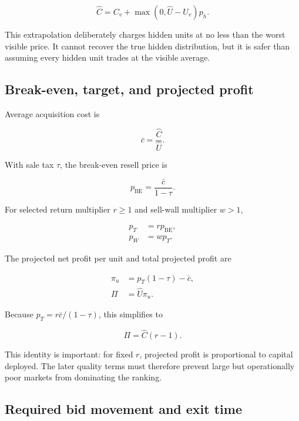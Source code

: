 \documentclass[11pt,a4paper]{article}
\begin{document}
\begin{equation}
\boxed{\widehat C=C_v+\max(0,\widehat U-U_v)p_h.}
\end{equation}

This extrapolation deliberately charges hidden units at no less than the worst visible price.
It cannot recover the true hidden distribution, but it is safer than assuming every hidden
unit trades at the visible average.

\subsection{Break-even, target, and projected profit}

Average acquisition cost is

\begin{equation}
\bar c=\frac{\widehat C}{\widehat U}.
\end{equation}

With sale tax $\tau$, the break-even resell price is

\begin{equation}
p_{\mathrm{BE}}=\frac{\bar c}{1-\tau}.
\end{equation}

For selected return multiplier $r\ge1$ and sell-wall multiplier $w>1$,

\begin{align}
p_T&=rp_{\mathrm{BE}},\\
p_W&=wp_T.
\end{align}

The projected net profit per unit and total projected profit are

\begin{align}
\pi_u&=p_T(1-\tau)-\bar c,\\
\Pi&=\widehat U\pi_u.
\end{align}

Because $p_T=r\bar c/(1-\tau)$, this simplifies to

\begin{equation}
\Pi=\widehat C(r-1).
\end{equation}

This identity is important: for fixed $r$, projected profit is proportional to capital
deployed. The later quality terms must therefore prevent large but operationally poor markets
from dominating the ranking.

\subsection{Required bid movement and exit time}
\end{document}
